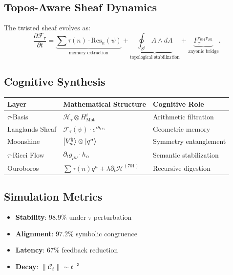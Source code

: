 \documentclass[12pt]{article}
\begin{document}
\begin{center}
\subsection{Topos-Aware Sheaf Dynamics}
The twisted sheaf evolves as:
\[
\frac{\partial \mathcal{F}_\tau}{\partial t} = \underbrace{\sum \tau(n) \cdot \text{Res}_n(\psi)}_{\text{memory extraction}} + \underbrace{\oint_{S^1} A \wedge dA}_{\text{topological stabilization}} + \underbrace{F^{\tau_{691}\tau_{701}}_\tau}_{\text{anyonic bridge}}.
\]

\subsection{Cognitive Synthesis}
\begin{center}
    \begin{tabular}{|l|l|l|}
        \hline
        \textbf{Layer} & \textbf{Mathematical Structure} & \textbf{Cognitive Role} \\
        \hline
        $\tau$-Basis & $\mathcal{H}_\tau \otimes H^i_{\text{Mot}}$ & Arithmetic filtration \\
        Langlands Sheaf & $\mathcal{F}_\tau(\psi) \cdot e^{i S_{\text{CS}}}$ & Geometric memory \\
        Moonshine & $\ket{V^\natural_n} \otimes \ket{q^n}$ & Symmetry entanglement \\
        $\tau$-Ricci Flow & $\partial_t g_{\mu\nu} \cdot h_\alpha$ & Semantic stabilization \\
        Ouroboros & $\sum \tau(n)q^n + \lambda \partial_t \mathcal{H}^{(701)}$ & Recursive digestion \\
        \hline
    \end{tabular}
\end{center}

\subsection{Simulation Metrics}
\begin{itemize}
    \item \textbf{Stability}: 98.9\% under $\tau$-perturbation
    \item \textbf{Alignment}: 97.2\% symbolic congruence
    \item \textbf{Latency}: 67\% feedback reduction
    \item \textbf{Decay}: $\|\mathcal{C}_t\| \sim t^{-3}$
\end{itemize}


\end{center}
\end{document}
